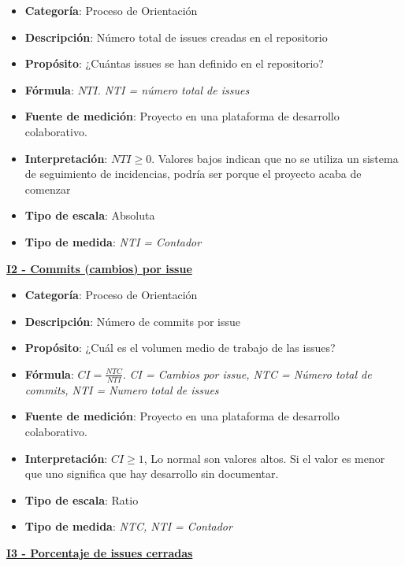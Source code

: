 \begin{itemize}
	\item \textbf{Categoría}: Proceso de Orientación
	\item \textbf{Descripción}: Número total de issues creadas en el repositorio
	\item \textbf{Propósito}: ¿Cuántas issues se han definido en el repositorio?
	\item \textbf{Fórmula}: $NTI$. \textit{NTI = número total de issues}
	\item \textbf{Fuente de medición}: Proyecto en una plataforma de desarrollo colaborativo.
	\item \textbf{Interpretación}: $NTI \geq 0$. Valores bajos indican que no se utiliza un sistema de seguimiento de incidencias, podría ser porque el proyecto acaba de comenzar
	\item \textbf{Tipo de escala}: Absoluta
	\item \textbf{Tipo de medida}: \textit{NTI = Contador}
\end{itemize}

\textbf{\underline{I2 - Commits (cambios) por issue}}

\begin{itemize}
	\item \textbf{Categoría}: Proceso de Orientación
	\item \textbf{Descripción}: Número de commits por issue
	\item \textbf{Propósito}: ¿Cuál es el volumen medio de trabajo de las issues?
	\item \textbf{Fórmula}: $CI = \frac{NTC}{NTI}$. \textit{CI = Cambios por issue, NTC = Número total de commits, NTI = Numero total de issues}
	\item \textbf{Fuente de medición}: Proyecto en una plataforma de desarrollo colaborativo.
	\item \textbf{Interpretación}: $CI \geq 1$, Lo normal son valores altos. Si el valor es menor que uno significa que hay desarrollo sin documentar.
	\item \textbf{Tipo de escala}: Ratio 
	\item \textbf{Tipo de medida}: \textit{NTC, NTI = Contador}
\end{itemize}

\textbf{\underline{I3 - Porcentaje de issues cerradas}}

